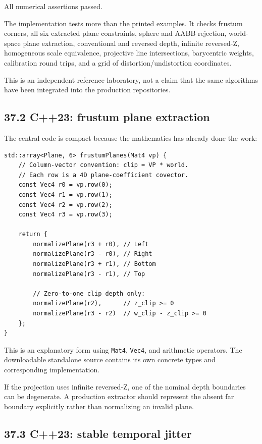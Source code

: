 All numerical assertions passed.

The implementation tests more than the printed examples. It checks frustum corners, all six extracted plane constraints, sphere and AABB rejection, world-space plane extraction, conventional and reversed depth, infinite reversed-Z, homogeneous scale equivalence, projective line intersections, barycentric weights, calibration round trips, and a grid of distortion/undistortion coordinates.

This is an independent reference laboratory, not a claim that the same algorithms have been integrated into the production repositories.

\subsection{37.2 C++23: frustum plane extraction}\label{02-foundations-ii-ch037-c23-frustum-plane-extraction}

The central code is compact because the mathematics has already done the work:

\begin{verbatim}
std::array<Plane, 6> frustumPlanes(Mat4 vp) {
    // Column-vector convention: clip = VP * world.
    // Each row is a 4D plane-coefficient covector.
    const Vec4 r0 = vp.row(0);
    const Vec4 r1 = vp.row(1);
    const Vec4 r2 = vp.row(2);
    const Vec4 r3 = vp.row(3);

    return {
        normalizePlane(r3 + r0), // Left
        normalizePlane(r3 - r0), // Right
        normalizePlane(r3 + r1), // Bottom
        normalizePlane(r3 - r1), // Top

        // Zero-to-one clip depth only:
        normalizePlane(r2),      // z_clip >= 0
        normalizePlane(r3 - r2)  // w_clip - z_clip >= 0
    };
}
\end{verbatim}

This is an explanatory form using \texttt{Mat4}, \texttt{Vec4}, and arithmetic operators. The downloadable standalone source contains its own concrete types and corresponding implementation.

If the projection uses infinite reversed-Z, one of the nominal depth boundaries can be degenerate. A production extractor should represent the absent far boundary explicitly rather than normalizing an invalid plane.

\subsection{37.3 C++23: stable temporal jitter}\label{02-foundations-ii-ch037-c23-stable-temporal-jitter}

